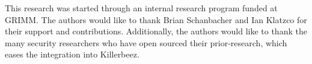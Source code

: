 This research was started through an internal research program funded at GRIMM.
The authors would like to thank Brian Schanbacher and Ian Klatzco for their
support and contributions.  Additionally, the authors would like to thank the
many security researchers who have open sourced their prior-research, which
eases the integration into Killerbeez.
